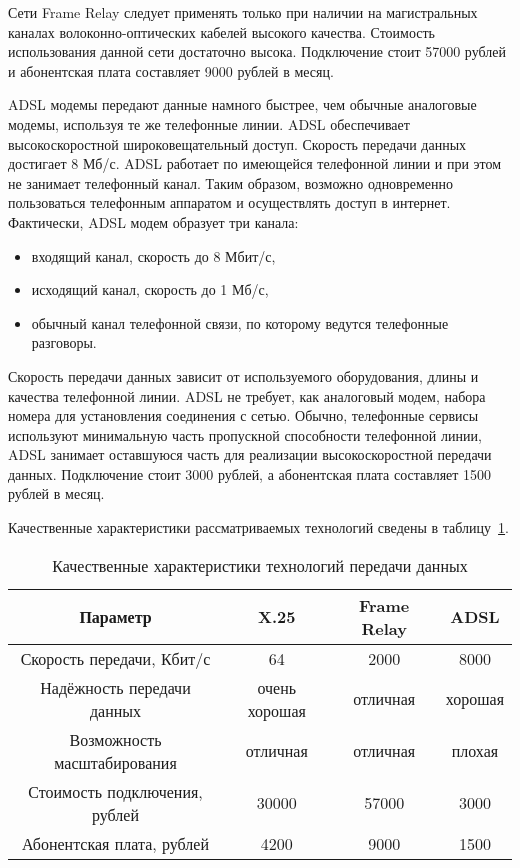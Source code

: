 Сети Frame Relay следует применять только при наличии на магистральных каналах волоконно-оптических кабелей высокого качества. Стоимость использования данной сети достаточно высока. Подключение стоит 57000 рублей и абонентская плата составляет 9000 рублей в месяц.\par\bigskip

ADSL модемы передают данные намного быстрее, чем обычные аналоговые модемы, используя те же телефонные линии. ADSL обеспечивает высокоскоростной широковещательный доступ. Скорость передачи данных достигает 8 Мб/с. ADSL работает по имеющейся телефонной линии и при этом не занимает телефонный канал. Таким образом, возможно одновременно пользоваться телефонным аппаратом и осуществлять доступ в интернет. Фактически, ADSL модем образует три канала:
\begin{itemize}
\item входящий канал, скорость до 8 Мбит/с, 
\item исходящий канал, скорость до 1 Мб/с, 
\item обычный канал телефонной связи, по которому ведутся телефонные разговоры.
\end{itemize}\par\bigskip

Скорость передачи данных зависит от используемого оборудования, длины и качества телефонной линии. ADSL не требует, как аналоговый модем, набора номера для установления соединения с сетью. Обычно, телефонные сервисы используют минимальную часть пропускной способности телефонной линии, ADSL занимает оставшуюся часть для реализации высокоскоростной передачи данных. Подключение стоит 3000 рублей, а абонентская плата составляет 1500 рублей в месяц.\par\bigskip

Качественные характеристики рассматриваемых технологий сведены в таблицу~\ref{table:ISP_compare_qual}.

\begin{table}[h]
\caption{Качественные характеристики технологий передачи данных}
\label{table:ISP_compare_qual}
\centering
  \begin{tabular}{|c|c|c|c|}
  \hline Параметр & X.25 & Frame Relay & ADSL \\
  \hline Скорость передачи, Кбит/с & 64 & 2000 & 8000 \\
  \hline Надёжность передачи данных & очень хорошая & отличная & хорошая \\
  \hline Возможность масштабирования & отличная & отличная & плохая \\
  \hline Стоимость подключения, рублей & 30000 & 57000 & 3000 \\
  \hline Абонентская плата, рублей & 4200 & 9000 & 1500 \\
  \hline
  \end{tabular}
\end{table}

